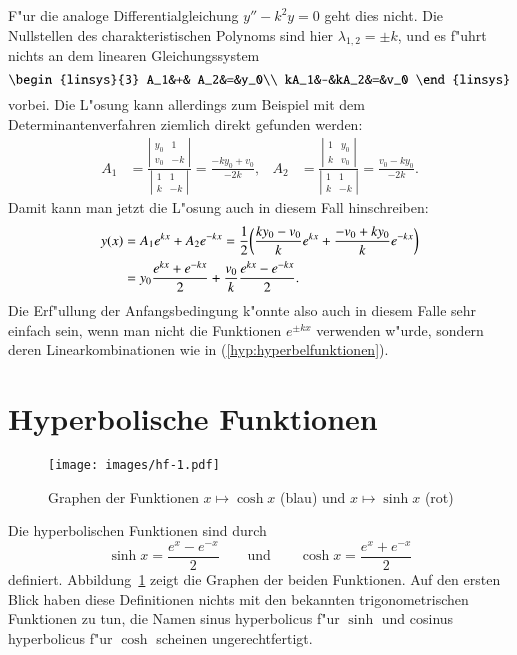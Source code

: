 \documentclass[a4paper,12pt]{article}
\begin{document}
F"ur die analoge Differentialgleichung $y''-k^2y=0$ geht dies nicht.
Die Nullstellen des charakteristischen Polynoms sind hier 
$\lambda_{1,2}=\pm k$, und es f"uhrt nichts an dem linearen Gleichungssystem
\[
\begin{linsys}{3}
 A_1&+& A_2&=&y_0\\
kA_1&-&kA_2&=&v_0
\end{linsys}
\]
vorbei.
Die L"osung kann allerdings zum Beispiel mit dem Determinantenverfahren
ziemlich direkt gefunden werden:
\begin{align*}
A_1
&=
\frac{\left|\begin{matrix}y_0&1\\v_0&-k\end{matrix}\right|}{\left|\begin{matrix}1&1\\k&-k\end{matrix}\right|}
=
\frac{-ky_0+v_0}{-2k},
&
A_2
&=
\frac{\left|\begin{matrix}1&y_0\\k&v_0\end{matrix}\right|}{\left|\begin{matrix}1&1\\k&-k\end{matrix}\right|}
=\frac{v_0-ky_0}{-2k}.
\end{align*}
Damit kann man jetzt die L"osung auch in diesem Fall hinschreiben:
\begin{align}
y(x)
&=
A_1e^{kx}+A_2e^{-kx}
=
\frac12\biggl(
\frac{ky_0-v_0}k e^{kx}
+
\frac{-v_0+ky_0}k e^{-kx}
\biggr)
\notag
\\
&=
y_0\frac{e^{kx}+e^{-kx}}2
+\frac{v_0}{k}\frac{e^{kx}-e^{-kx}}2.
\label{hyp:hyperbelfunktionen}
\end{align}
Die Erf"ullung der Anfangsbedingung k"onnte also auch in diesem Falle
sehr einfach sein, wenn man nicht die Funktionen $e^{\pm kx}$ verwenden
w"urde, sondern deren Linearkombinationen wie in (\ref{hyp:hyperbelfunktionen}).

\section{Hyperbolische Funktionen}
\begin{figure}
\centering
\texttt{[image: images/hf-1.pdf]}
\caption{Graphen der Funktionen $x\mapsto\cosh x$ (blau)
und $x\mapsto\sinh x$ (rot)
\label{hyp:graphen}}
\end{figure}
Die hyperbolischen Funktionen sind durch
\[
\sinh x =\frac{e^x-e^{-x}}2
\qquad\text{und}\qquad
\cosh x = \frac{e^x+e^{-x}}2
\]
definiert.
Abbildung~\ref{hyp:graphen} zeigt die Graphen der beiden Funktionen.
Auf den ersten Blick haben diese Definitionen nichts mit den bekannten
trigonometrischen Funktionen zu tun, die Namen sinus hyperbolicus f"ur
$\sinh$ und cosinus hyperbolicus f"ur $\cosh$ scheinen ungerechtfertigt.
\end{document}
